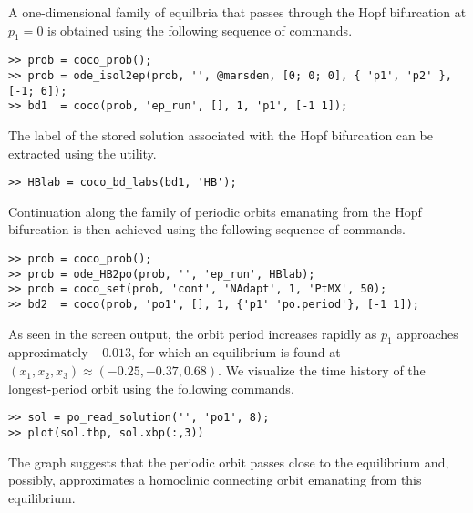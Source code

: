 A one-dimensional family of equilbria that passes through the Hopf bifurcation at $p_1=0$ is obtained using the following sequence of commands.
\begin{lstlisting}[language=coco-highlight]
>> prob = coco_prob();
>> prob = ode_isol2ep(prob, '', @marsden, [0; 0; 0], { 'p1', 'p2' }, [-1; 6]);
>> bd1  = coco(prob, 'ep_run', [], 1, 'p1', [-1 1]);
\end{lstlisting}
The label of the stored solution associated with the Hopf bifurcation can be extracted using the  utility.
\begin{lstlisting}[language=coco-highlight]
>> HBlab = coco_bd_labs(bd1, 'HB');
\end{lstlisting}
Continuation along the family of periodic orbits emanating from the Hopf bifurcation is then achieved using the following sequence of commands.
\begin{lstlisting}[language=coco-highlight]
>> prob = coco_prob();
>> prob = ode_HB2po(prob, '', 'ep_run', HBlab);
>> prob = coco_set(prob, 'cont', 'NAdapt', 1, 'PtMX', 50);
>> bd2  = coco(prob, 'po1', [], 1, {'p1' 'po.period'}, [-1 1]);
\end{lstlisting}
As seen in the screen output, the orbit period increases rapidly as $p_1$ approaches approximately $-0.013$, for which an equilibrium is found at $(x_1,x_2,x_3)\approx(-0.25,-0.37,0.68)$. We visualize the time history of the longest-period orbit using the following commands.
\begin{lstlisting}[language=coco-highlight]
>> sol = po_read_solution('', 'po1', 8);
>> plot(sol.tbp, sol.xbp(:,3))
\end{lstlisting}
The graph suggests that the periodic orbit passes close to the equilibrium and, possibly, approximates a homoclinic connecting orbit emanating from this equilibrium. 

